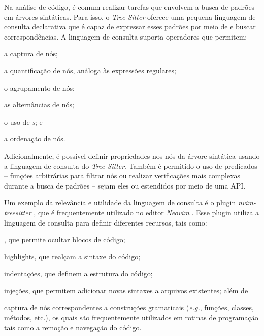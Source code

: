 \documentclass
  [11pt, a4paper, english, openright, sumario = tradicional, twoside, brazil]
  {abntex2}
\begin{document}
  Na análise de código, é comum realizar tarefas que envolvem a busca de
  padrões em árvores sintáticas. Para isso, o \textit{Tree-Sitter} oferece uma
  pequena linguagem de consulta declarativa que é capaz de expressar esses
  padrões por meio de \textit{} e buscar correspondências. A
  linguagem de consulta suporta operadores que permitem:
  \begin{inparaenum}
    \item a captura de nós;
    \item a quantificação de nós, análoga às expressões regulares;
    \item o agrupamento de nós;
    \item as alternâncias de nós;
    \item o uso de \textit{s}; e
    \item a ordenação de nós.
  \end{inparaenum}
  Adicionalmente, é possível definir propriedades nos nós da árvore sintática
  usando a linguagem de consulta do \textit{Tree-Sitter}. Também é permitido o
  uso de predicados -- funções arbitrárias para filtrar nós ou realizar
  verificações mais complexas durante a busca de padrões -- sejam eles
  \textit{} ou estendidos por meio de uma API.

  Um exemplo da relevância e utilidade da linguagem de consulta é o plugin
  \textit{nvim-treesitter} \cite{nvim-treesitter-2023-nvim}, que é
  frequentemente utilizado no editor \textit{Neovim}
  \cite{neovim-2014-hyperextensible}. Esse plugin utiliza a linguagem de
  consulta para definir diferentes recursos, tais como:
  \begin{inparaenum}
    \item \textit{}, que permite ocultar blocos de código;
    \item highlights, que realçam a sintaxe do código;
    \item indentações, que definem a estrutura do código;
    \item injeções, que permitem adicionar novas sintaxes a arquivos
          existentes; além de
    \item captura de nós correspondentes a construções gramaticais
          (\textit{e.g.}, funções, classes, métodos, etc.), os quais são
          frequentemente utilizados em rotinas de programação tais como a
          remoção e navegação do código.
  \end{inparaenum}
\end{document}

